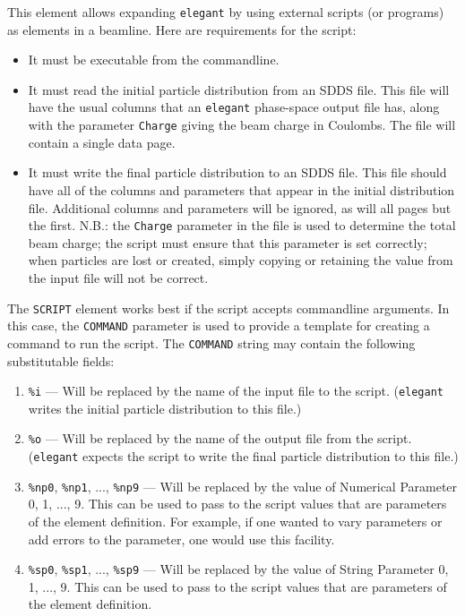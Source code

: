 This element allows expanding {\tt elegant} by using external scripts
(or programs) as elements in a beamline.    Here are requirements for the 
script:
\begin{itemize}
\item It must be executable from the commandline.
\item It must read the initial particle distribution from an SDDS file.
This file will have the usual columns that an {\tt elegant} phase-space
output file  has, along with the parameter {\tt Charge} giving the 
beam charge in Coulombs. The file will contain a single data page.
\item It must write the final particle distribution to an SDDS file.
This file should have all of the columns and parameters that appear in the
initial distribution file.  Additional columns and parameters will be ignored,
as will all pages but the first. N.B.: the {\tt Charge} parameter in the file
is used to determine the total beam charge; the script must ensure that this parameter
is set correctly; when particles are lost or created, simply copying or retaining the value
from the input file will not be correct.
\end{itemize}

The {\tt SCRIPT} element works best if the script accepts commandline
arguments.  In this case, the {\tt COMMAND} parameter is used to
provide a template for creating a command to run the script.  The {\tt COMMAND}
string may contain the following substitutable fields:
\begin{enumerate}
\item \verb|%i| --- Will be replaced by the name of the input file to the script.
({\tt elegant} writes the initial particle distribution to this file.)
\item \verb|%o| --- Will be replaced by the name of the output file from the script.
({\tt elegant} expects the script to write the final particle distribution to this file.)
\item \verb|%np0|, \verb|%np1|, ..., \verb|%np9| --- Will be replaced by the value of
 Numerical Parameter 0, 1, ..., 9.  This can be used to pass to the script values that
 are parameters of the element definition.  For example, if one wanted to vary parameters 
 or add errors to the parameter, one would use this facility.
\item \verb|%sp0|,  \verb|%sp1|, ..., \verb|%sp9| --- Will be replaced by the value of
 String Parameter 0, 1, ..., 9.  This can be used to pass to the script values that
 are parameters of the element definition. 
\end{enumerate}

